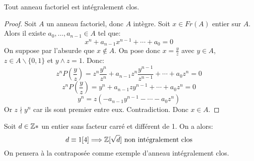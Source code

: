\begin{proposition}{}{}
    Tout anneau factoriel est intégralement clos.
\end{proposition}

\begin{proof}
    Soit $A$ un anneau factoriel, donc $A$ intègre. \newline
    Soit $x \in Fr(A)$ entier sur $A$. Alors il existe $a_0, \dots, a_{n-1} \in A$ tel que: 
    \[x^n + a_{n-1}x^{n-1} + \cdots + a_0 = 0\]
    On suppose par l'absurde que $x \notin A$. \newline
    On pose donc $x = \frac{y}{z}$ avec $y \in A$, $z \in A \backslash \{0,1\}$ et $y \wedge z = 1$.
    Donc:
    \[ z^n P(\frac{y}{z}) = z^n \frac{y^n}{z^n} + a_{n-1} z^n \frac{y^{n-1}}{z^{n-1}} + \cdots + a_0 z^n = 0 \]
    \[ z^n P(\frac{y}{z}) = y^n + a_{n-1} z y^{n-1} + \cdots + a_0 z^n = 0\]
    \[ y^n = z (- a_{n-1} y^{n-1} - \cdots - a_0 z^n) \]
    Or $z \nmid y^n$ car ils sont premier entre eux. Contradiction. Donc $x \in A$.
\end{proof}

\begin{example}{}{}
    Soit $d \in \mathbb{Z}*$ un entier sans facteur carré et différent de 1. On a alors:
    \[ d \equiv 1 [4] \Longrightarrow \mathbb{Z}[\sqrt{d}] ~ \text{non intégralement clos} \]
    On pensera à la contraposée comme exemple d'anneau intégralement clos.
\end{example}